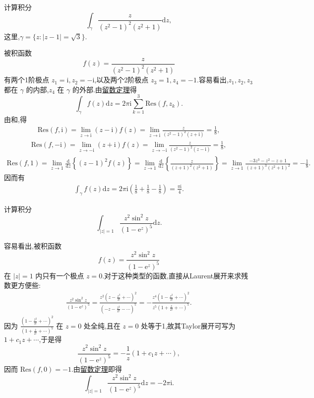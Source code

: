 \documentclass[../../main.tex]{subfiles}
\begin{document}
\begin{example}
计算积分
\[
\int_{\gamma} \frac{z}{(z^2 - 1)^2 (z^2 + 1)} \mathrm{d}z,
\]
这里,\( \gamma = \{ z: |z - 1| = \sqrt{3} \} \).
\end{example}
\begin{solution}
被积函数
\[
f(z) = \frac{z}{(z^2 - 1)^2 (z^2 + 1)}
\]
有两个1阶极点 \( z_1 = \mathrm{i}, z_2 = -\mathrm{i} \),以及两个2阶极点 \( z_3 = 1, z_4 = -1 \).容易看出,\( z_1, z_2, z_3 \) 都在 \( \gamma \) 的内部,\( z_4 \) 在 \( \gamma \) 的外部.由\hyperref[theorem:留数定理(残数定理)-定理5.4.9]{留数定理}得
\[
\int_{\gamma} f(z) \mathrm{d}z = 2\pi \mathrm{i} \sum_{k = 1}^{3} \mathrm{Res}(f, z_k).
\]
由和,得
\begin{align*}
\mathrm{Res}(f, \mathrm{i}) = \lim_{z \to \mathrm{i}} (z - \mathrm{i}) f(z) = \lim_{z \to \mathrm{i}} \frac{z}{(z^2 - 1)^2 (z + \mathrm{i})} = \frac{1}{8},
\end{align*}
\begin{align*}
\mathrm{Res}(f, -\mathrm{i}) = \lim_{z \to -\mathrm{i}} (z + \mathrm{i}) f(z) = \lim_{z \to -\mathrm{i}} \frac{z}{(z^2 - 1)^2 (z - \mathrm{i})} = \frac{1}{8},
\end{align*}
\begin{align*}
\mathrm{Res}(f, 1) = \lim_{z \to 1} \frac{\mathrm{d}}{\mathrm{d}z} \left\{ (z - 1)^2 f(z) \right\} = \lim_{z \to 1} \frac{\mathrm{d}}{\mathrm{d}z} \left\{ \frac{z}{(z + 1)^2 (z^2 + 1)} \right\} = \lim_{z \to 1} \frac{-3z^3 - z^2 - z + 1}{(z + 1)^3 (z^2 + 1)^2} = -\frac{1}{8}.
\end{align*}
因而有
\begin{align*}
\int_{\gamma} f(z) \mathrm{d}z = 2\pi \mathrm{i} \left( \frac{1}{8} + \frac{1}{8} - \frac{1}{8} \right) = \frac{\pi \mathrm{i}}{4}.
\end{align*}
\end{solution}

\begin{example}
计算积分
\[
\int_{|z| = 1} \frac{z^2 \sin^2 z}{(1 - \mathrm{e}^z)^5} \mathrm{d}z.
\]
\end{example}
\begin{solution}
容易看出,被积函数
\[
f(z) = \frac{z^2 \sin^2 z}{(1 - \mathrm{e}^z)^5}
\]
在 \( |z| = 1 \) 内只有一个极点 \( z = 0 \).对于这种类型的函数,直接从Laurent展开来求残数更方便些:
\begin{align*}
\frac{z^2 \sin^2 z}{(1 - \mathrm{e}^z)^5} = \frac{z^2 \left( z - \frac{z^3}{3!} + \cdots \right)^2}{\left( -z - \frac{z^2}{2!} - \cdots \right)^5} = -\frac{z^4 \left( 1 - \frac{z^2}{3!} + \cdots \right)^2}{z^5 \left( 1 + \frac{z}{2!} + \cdots \right)^5}.
\end{align*}
因为 \( \frac{\left( 1 - \frac{z^2}{3!} + \cdots \right)^2}{\left( 1 + \frac{z}{2!} + \cdots \right)^5} \) 在 \( z = 0 \) 处全纯,且在 \( z = 0 \) 处等于1,故其Taylor展开可写为 \( 1 + c_1 z + \cdots \),于是得
\[
\frac{z^2 \sin^2 z}{(1 - \mathrm{e}^z)^5} = -\frac{1}{z} (1 + c_1 z + \cdots),
\]
因而 \( \mathrm{Res}(f, 0) = -1 \).由\hyperref[theorem:留数定理(残数定理)-定理5.4.9]{留数定理}即得
\[
\int_{|z| = 1} \frac{z^2 \sin^2 z}{(1 - \mathrm{e}^z)^5} \mathrm{d}z = -2\pi \mathrm{i}.
\]
\end{solution}
\end{document}
